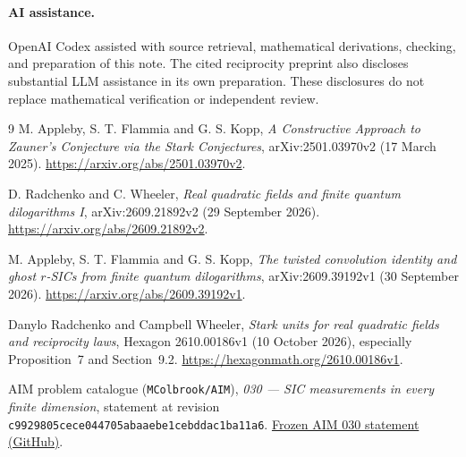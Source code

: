 \documentclass[11pt]{article}
\begin{document}
\paragraph{AI assistance.}
OpenAI Codex assisted with source retrieval, mathematical derivations,
checking, and preparation of this note. The cited reciprocity preprint also
discloses substantial LLM assistance in its own preparation. These disclosures
do not replace mathematical verification or independent review.

\begin{thebibliography}{9}
M. Appleby, S. T. Flammia and G. S. Kopp,
\emph{A Constructive Approach to Zauner's Conjecture via the Stark Conjectures},
arXiv:2501.03970v2 (17 March 2025).
\url{https://arxiv.org/abs/2501.03970v2}.

D. Radchenko and C. Wheeler,
\emph{Real quadratic fields and finite quantum dilogarithms I},
arXiv:2609.21892v2 (29 September 2026).
\url{https://arxiv.org/abs/2609.21892v2}.

M. Appleby, S. T. Flammia and G. S. Kopp,
\emph{The twisted convolution identity and ghost $r$-SICs from finite
quantum dilogarithms}, arXiv:2609.39192v1 (30 September 2026).
\url{https://arxiv.org/abs/2609.39192v1}.

Danylo Radchenko and Campbell Wheeler,
\emph{Stark units for real quadratic fields and reciprocity laws},
Hexagon 2610.00186v1 (10 October 2026), especially Proposition~7 and
Section~9.2.
\url{https://hexagonmath.org/2610.00186v1}.

AIM problem catalogue (\texttt{MColbrook/AIM}),
\emph{030 --- SIC measurements in every finite dimension},
statement at revision \texttt{c9929805cece044705abaaebe1cebddac1ba11a6}.
\href{https://github.com/MColbrook/AIM/blob/c9929805cece044705abaaebe1cebddac1ba11a6/problems/030-sic-povms.md}{Frozen AIM 030 statement (GitHub)}.
\end{thebibliography}
\end{document}

